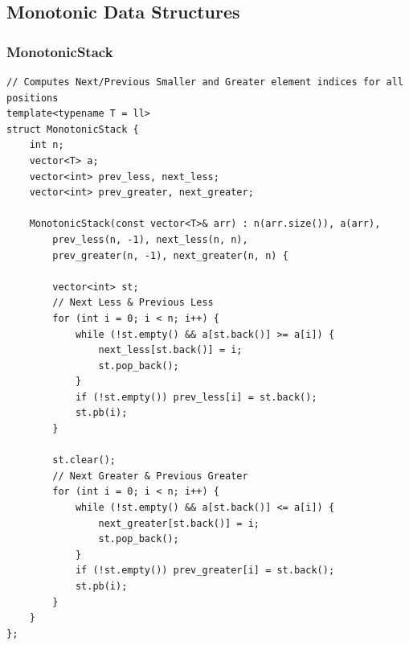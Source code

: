 \documentclass[9pt,a4paper,twocolumn]{extarticle}
\begin{document}
\subsection{Monotonic Data Structures}

\filbreak
\subsubsection{MonotonicStack}
\nopagebreak
\begin{lstlisting}
// Computes Next/Previous Smaller and Greater element indices for all positions
template<typename T = ll>
struct MonotonicStack {
    int n;
    vector<T> a;
    vector<int> prev_less, next_less;
    vector<int> prev_greater, next_greater;

    MonotonicStack(const vector<T>& arr) : n(arr.size()), a(arr),
        prev_less(n, -1), next_less(n, n),
        prev_greater(n, -1), next_greater(n, n) {
        
        vector<int> st;
        // Next Less & Previous Less
        for (int i = 0; i < n; i++) {
            while (!st.empty() && a[st.back()] >= a[i]) {
                next_less[st.back()] = i;
                st.pop_back();
            }
            if (!st.empty()) prev_less[i] = st.back();
            st.pb(i);
        }

        st.clear();
        // Next Greater & Previous Greater
        for (int i = 0; i < n; i++) {
            while (!st.empty() && a[st.back()] <= a[i]) {
                next_greater[st.back()] = i;
                st.pop_back();
            }
            if (!st.empty()) prev_greater[i] = st.back();
            st.pb(i);
        }
    }
};
\end{lstlisting}

\filbreak
\end{document}
